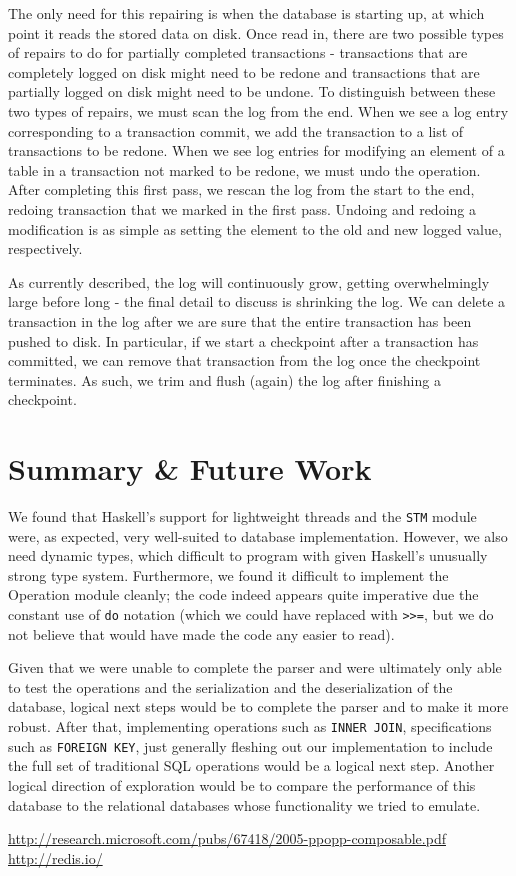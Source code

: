 \documentclass[10pt]{article}
\begin{document}
\begin{multicols}{2}
The only need for this repairing is when the database is starting up, at which point it reads the stored data on disk. Once read in, there are two possible types of repairs to do for partially completed transactions - transactions that are completely logged on disk might need to be redone and transactions that are partially logged on disk might need to be undone. To distinguish between these two types of repairs, we must scan the log from the end. When we see a log entry corresponding to a transaction commit, we add the transaction to a list of transactions to be redone. When we see log entries for modifying an element of a table in a transaction not marked to be redone, we must undo the operation. After completing this first pass, we rescan the log from the start to the end, redoing transaction that we marked in the first pass. Undoing and redoing a modification is as simple as setting the element to the old and new logged value, respectively.

As currently described, the log will continuously grow, getting overwhelmingly large before long - the final detail to discuss is shrinking the log. We can delete a transaction in the log after we are sure that the entire transaction has been pushed to disk. In particular, if we start a checkpoint after a transaction has committed, we can remove that transaction from the log once the checkpoint terminates. As such, we trim and flush (again) the log after finishing a checkpoint.

\section{Summary \& Future Work}
We found that Haskell's support for lightweight threads and the \texttt{STM} module were, as expected, very well-suited to database implementation. However, we also need dynamic types, which difficult to program with given Haskell's unusually strong type system. Furthermore, we found it difficult to implement the Operation module cleanly; the code indeed appears quite imperative due the constant use of \texttt{do} notation (which we could have replaced with \texttt{>>=}, but we do not believe that would have made the code any easier to read). 

Given that we were unable to complete the parser and were ultimately only able to test the operations and the serialization and the deserialization of the database, logical next steps would be to complete the parser and to make it more robust. After that, implementing operations such as \texttt{INNER JOIN}, specifications such as \texttt{FOREIGN KEY}, just generally fleshing out our implementation to include the full set of traditional SQL operations would be a logical next step. Another logical direction of exploration would be to compare the performance of this database to the relational databases whose functionality we tried to emulate.

\end{multicols}

\begin{thebibliography}{1}

 \url{http://research.microsoft.com/pubs/67418/2005-ppopp-composable.pdf}
 \url{http://redis.io/}

\end{thebibliography}
\end{document}
